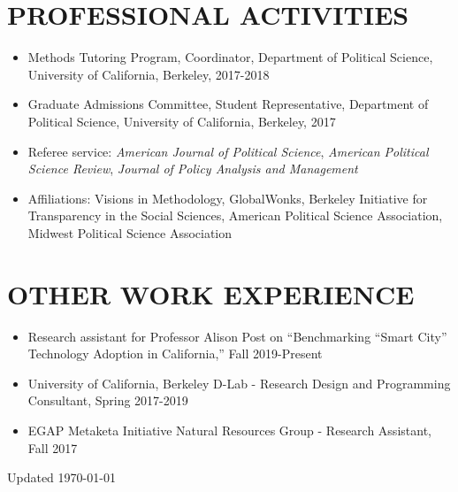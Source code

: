 \documentclass[11pt]{article}
\begin{document}
\vspace{3mm}
\section*{PROFESSIONAL ACTIVITIES}


\begin{itemize}	

\item[]Methods Tutoring Program, Coordinator, Department of Political Science, University of California, Berkeley, 2017-2018
\item[]Graduate Admissions Committee, Student Representative, Department of Political Science, University of California, Berkeley, 2017
\item[]Referee service: \textit{American Journal of Political Science}, \textit{American Political Science Review}, \textit{Journal of Policy Analysis and Management}
\item[]Affiliations: Visions in Methodology, GlobalWonks, Berkeley Initiative for Transparency in the Social Sciences, American Political Science Association, Midwest Political Science Association
\end{itemize}


\vspace{3mm}
\section*{OTHER WORK EXPERIENCE}
	\begin{itemize}
	\item[]Research assistant for Professor Alison Post on ``Benchmarking ``Smart City'' Technology Adoption in California,'' Fall 2019-Present
	\item[]University of California, Berkeley D-Lab - Research Design and Programming Consultant, Spring 2017-2019
	\item[]EGAP Metaketa Initiative Natural Resources Group - Research Assistant, Fall 2017
\end{itemize}




\vspace*{\fill}

Updated \today
\end{document}
